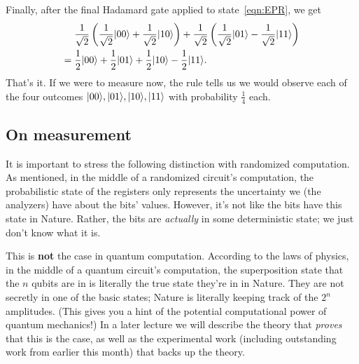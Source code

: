\documentclass[12pt]{article}
\begin{document}
Finally, after the final Hadamard gate applied to state~\eqref{eqn:EPR}, we get
\begin{align*}
    & \frac1{\sqrt 2} \left(\frac1{\sqrt 2}\ket{00} + \frac1{\sqrt 2}\ket{10}\right) + \frac1{\sqrt 2} \left(\frac1{\sqrt 2}\ket{01} - \frac1{\sqrt 2}\ket{11}\right) \\
    ={ }& \frac12\ket{00} + \frac12\ket{01} + \frac12\ket{10} - \frac12\ket{11}.
\end{align*}
That's it.  If we were to measure now, the rule tells us we would observe each of the four outcomes $\ket{00}, \ket{01}, \ket{10}, \ket{11}$ with probability $\frac14$ each.

\subsection{On measurement}

It is important to stress the following distinction with randomized computation.  As mentioned, in the middle of a randomized circuit's computation, the probabilistic state of the registers only represents the uncertainty we (the analyzers) have about the bits' values.  However, it's not like the bits have this state in Nature.  Rather, the bits are \emph{actually} in some deterministic state; we just don't know what it is.

This is \textbf{not} the case in quantum computation.  According to the laws of physics, in the middle of a quantum circuit's computation, the superposition state that the $n$ qubits are in is literally the true state they're in in Nature.  They are not secretly in one of the basic states; Nature is literally keeping track of the $2^n$ amplitudes.  (This gives you a hint of the potential computational power of quantum mechanics!)  In a later lecture we will describe the theory that \emph{proves} that this is the case, as well as the experimental work (including outstanding work from earlier this month) that backs up the theory.

           

\end{document}
